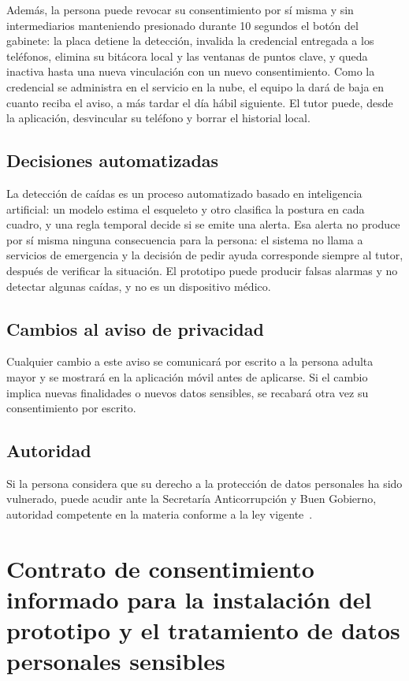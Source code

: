 \documentclass[12pt,a4paper,oneside]{book}
\theoremstyle{plain}
\theoremstyle{definition}
\theoremstyle{remark}
\begin{document}
Además, la persona puede revocar su consentimiento por sí misma y sin intermediarios manteniendo presionado durante 10 segundos el botón del gabinete: la placa detiene la detección, invalida la credencial entregada a los teléfonos, elimina su bitácora local y las ventanas de puntos clave, y queda inactiva hasta una nueva vinculación con un nuevo consentimiento. Como la credencial se administra en el servicio en la nube, el equipo la dará de baja en cuanto reciba el aviso, a más tardar el día hábil siguiente. El tutor puede, desde la aplicación, desvincular su teléfono y borrar el historial local.

\subsection{Decisiones automatizadas}

La detección de caídas es un proceso automatizado basado en inteligencia artificial: un modelo estima el esqueleto y otro clasifica la postura en cada cuadro, y una regla temporal decide si se emite una alerta. Esa alerta no produce por sí misma ninguna consecuencia para la persona: el sistema no llama a servicios de emergencia y la decisión de pedir ayuda corresponde siempre al tutor, después de verificar la situación. El prototipo puede producir falsas alarmas y no detectar algunas caídas, y no es un dispositivo médico.

\subsection{Cambios al aviso de privacidad}

Cualquier cambio a este aviso se comunicará por escrito a la persona adulta mayor y se mostrará en la aplicación móvil antes de aplicarse. Si el cambio implica nuevas finalidades o nuevos datos sensibles, se recabará otra vez su consentimiento por escrito.

\subsection{Autoridad}

Si la persona considera que su derecho a la protección de datos personales ha sido vulnerado, puede acudir ante la Secretaría Anticorrupción y Buen Gobierno, autoridad competente en la materia conforme a la ley vigente~\cite{LFPDPPP}.

\clearpage
\section{Contrato de consentimiento informado para la instalación del prototipo y el tratamiento de datos personales sensibles}
\label{anx:contrato}
\end{document}
